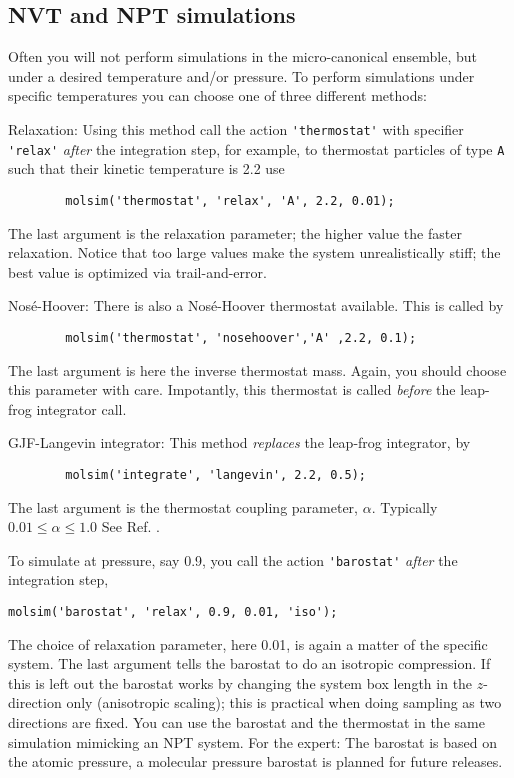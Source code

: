 \documentclass[11pt]{article}
\begin{document}
\subsection{NVT and NPT simulations}
Often you will not perform simulations in the micro-canonical
ensemble, but under a desired temperature and/or pressure. To perform
simulations under specific temperatures you can choose one of three
different methods:
\begin{description}
	\item{Relaxation:} 
		Using this method call the action \verb!'thermostat'! with specifier
		\verb!'relax'! \emph{after} the integration step, for example, to thermostat particles of type 
		\verb!A! such that their kinetic temperature is 2.2 use 
		\begin{verbatim}
		molsim('thermostat', 'relax', 'A', 2.2, 0.01);
		\end{verbatim}
		The last argument is the relaxation parameter; the higher value the faster
		relaxation. Notice that too large values make the system unrealistically
		stiff; the best value is optimized via trail-and-error. 
	\item{Nos\'{e}-Hoover:} 
		There is also a Nos\'{e}-Hoover thermostat available. This 
		is called by 
		\begin{verbatim}
		molsim('thermostat', 'nosehoover','A' ,2.2, 0.1);
		\end{verbatim}
		The last argument is here the inverse thermostat mass. Again, you should choose this parameter with care.
		Impotantly, this thermostat is called \emph{before} the leap-frog integrator call.
	\item{GJF-Langevin integrator:}
		This method \emph{replaces} the leap-frog integrator, by 
		\begin{verbatim}
		molsim('integrate', 'langevin', 2.2, 0.5);
		\end{verbatim}
		The last argument is the thermostat coupling parameter, $\alpha$. Typically $0.01 \leq \alpha \leq 1.0$ 
		See Ref. \cite{gjf}.
\end{description}

To simulate at pressure, say 0.9, you call the action \verb!'barostat'! 
\emph{after} the integration step,
\begin{verbatim}
molsim('barostat', 'relax', 0.9, 0.01, 'iso');
\end{verbatim}
The choice of relaxation parameter, here 0.01, is again a matter of the specific
system. The last argument tells the barostat to do an isotropic compression. If
this is left out the barostat works by changing the system box length in the
$z$-direction only (anisotropic scaling); this is practical when doing sampling
as two directions are fixed. You can use the barostat and the thermostat
in the same simulation mimicking an NPT system. For the expert: The barostat is
based on the atomic pressure, a molecular pressure barostat is planned for
future releases. 
\end{document}

